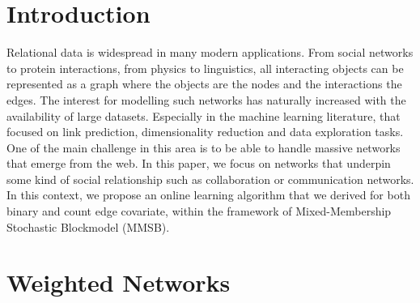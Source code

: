 \section{Introduction}

Relational data is widespread in many modern applications. From social networks to protein interactions, from physics to linguistics, all interacting objects can be represented as a graph where the objects are the nodes and the interactions the edges. The interest for modelling such networks has naturally increased with the availability of large datasets. Especially in the machine learning literature, that focused on link prediction, dimensionality reduction and data exploration tasks. One of the main challenge in this area is to be able to handle massive networks that emerge from the web. In this paper, we focus on networks that underpin some kind of social relationship such as collaboration or communication networks. In this context, we propose an online learning algorithm that we derived for both binary and count edge covariate, within the framework of Mixed-Membership Stochastic Blockmodel (MMSB).



\section{Weighted Networks}

